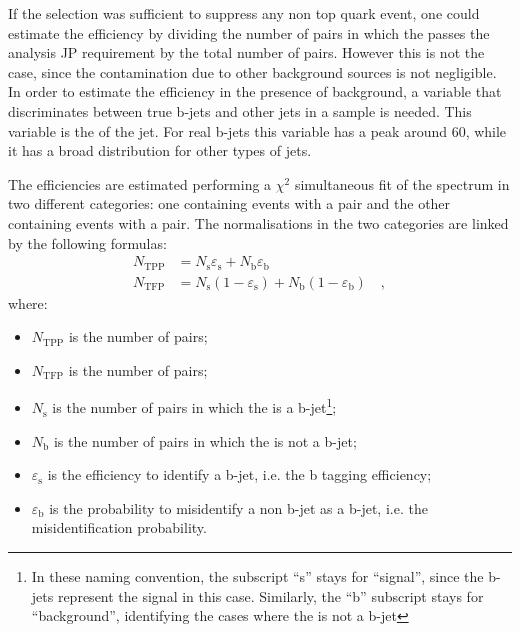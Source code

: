 If the \tg selection was sufficient to suppress any non top quark event, one could estimate the efficiency by dividing the number of \tp pairs in which the \probe passes the analysis JP requirement by the total number of \tp pairs. However this is not the case, since the contamination due to other background sources is not negligible. In order to estimate the efficiency in the presence of background, a variable that discriminates between true b-jets and other jets in a \ttbar sample is needed. This variable is the \pt of the \probe jet. For real b-jets this variable has a peak around 60\GeV, while it has a broad distribution for other types of jets.

The efficiencies are estimated performing a $\chi^{2}$ simultaneous fit of the \probe \pt spectrum in two different categories: one containing events with a \tpp pair and the other containing events with a \tfp pair. The normalisations in the two categories are linked by the following formulas:
\begin{equation}
\begin{split}
N_\mathrm{TPP} &= N_\mathrm{s} \varepsilon_\mathrm{s} + N_\mathrm{b} \varepsilon_\mathrm{b} \\
N_\mathrm{TFP} &= N_\mathrm{s} (1 -\varepsilon_\mathrm{s}) + N_\mathrm{b} ( 1 - \varepsilon_\mathrm{b}) \quad,
\end{split}
\end{equation}
\noindent where:
\begin{itemize}
\item $N_\mathrm{TPP}$ is the number of \tpp pairs;
\item $N_\mathrm{TFP}$ is the number of \tfp pairs;
\item $N_\mathrm{s}$ is the number of \tp pairs in which the \probe is a b-jet\footnote{In these naming convention, the subscript ``s'' stays for ``signal'', since the b-jets represent the signal in this case. Similarly, the ``b'' subscript stays for ``background'', identifying the cases where the \probe is not a b-jet};
\item $N_\mathrm{b}$ is the number of \tp pairs in which the \probe is not a b-jet;
\item $\varepsilon_\mathrm{s}$ is the efficiency to identify a b-jet, i.e. the b tagging efficiency;
\item $\varepsilon_\mathrm{b}$ is the probability to misidentify a non b-jet as a b-jet, i.e. the misidentification probability.
\end{itemize}

